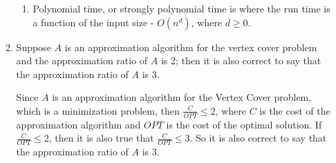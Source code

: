 \documentclass[paper=a4, fontsize=11pt]{scrartcl} %
\numberwithin{figure}{section} %
\numberwithin{table}{section} %
\begin{document}
\begin{enumerate}
\begin{enumerate}
\begin{enumerate}
\item Polynomial time, or strongly polynomial time is where the run time is a function of the input size - $O(n^d)$, where $d \geq 0$. 

\end{enumerate}

\item Suppose $A$ is an approximation algorithm for the vertex cover problem and the approximation ratio of $A$ is 2; then it is also correct to say that the approximation ratio of $A$ is 3.

Since $A$ is an approximation algorithm for the Vertex Cover problem, which is a minimization problem, then $\frac{C}{OPT} \leq 2$, where $C$ is the cost of the approximation algorithm and $OPT$ is the cost of the optimal solution. If $\frac{C}{OPT} \leq 2$, then it is also true that $\frac{C}{OPT} \leq 3$. So it is also correct to say that the approximation ratio of $A$ is 3.

\end{enumerate}

\end{enumerate}

\end{document}
